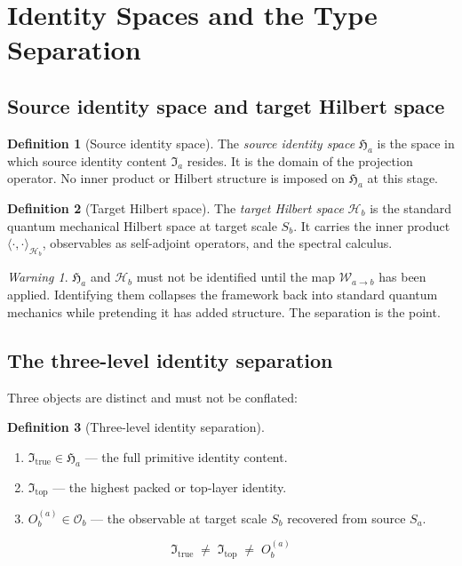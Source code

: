 \documentclass[12pt, a4paper]{article}
\theoremstyle{definition}
\newtheorem{defn}{Definition}[section]
\theoremstyle{plain}
\theoremstyle{remark}
\newtheorem{warning}{Warning}[section]
\newcommand{\Itrue}{\mathfrak{I}_{\mathrm{true}}}
\newcommand{\Itop}{\mathfrak{I}_{\mathrm{top}}}
\newcommand{\Ia}{\mathfrak{I}_a}
\newcommand{\Ha}{\mathfrak{H}_a}        %
\newcommand{\Hb}{\mathcal{H}_b}         %
\newcommand{\Osp}{\mathcal{O}_b}        %
\newcommand{\Sa}{S_a}
\newcommand{\Sb}{S_b}
\newcommand{\Wab}{\mathcal{W}_{a\to b}}   %
\newcommand{\Oba}{O_b^{(a)}}
\begin{document}
\section{Identity Spaces and the Type Separation}
\label{sec:spaces}

\subsection{Source identity space and target Hilbert space}

\begin{defn}[Source identity space]
\label{def:Ha}
The \emph{source identity space} $\Ha$ is the space in which source
identity content $\Ia$ resides.
It is the domain of the projection operator.
No inner product or Hilbert structure is imposed on $\Ha$ at this stage.
\end{defn}

\begin{defn}[Target Hilbert space]
\label{def:Hb}
The \emph{target Hilbert space} $\Hb$ is the standard quantum
mechanical Hilbert space at target scale $\Sb$.
It carries the inner product $\langle\cdot,\cdot\rangle_{\Hb}$,
observables as self-adjoint operators, and the spectral calculus.
\end{defn}

\begin{warning}
$\Ha$ and $\Hb$ must not be identified until the map $\Wab$ has been
applied.
Identifying them collapses the framework back into standard quantum
mechanics while pretending it has added structure.
The separation is the point.
\end{warning}

\subsection{The three-level identity separation}

Three objects are distinct and must not be conflated:

\begin{defn}[Three-level identity separation]
\label{def:threelevel}
\begin{enumerate}[label=(\roman*)]
  \item $\Itrue \in \Ha$ — the full primitive identity content.
  \item $\Itop$ — the highest packed or top-layer identity.
  \item $\Oba \in \Osp$ — the observable at target scale $\Sb$
    recovered from source $\Sa$.
\end{enumerate}
\[
  \Itrue \;\neq\; \Itop \;\neq\; \Oba
\]
\end{defn}
\end{document}
